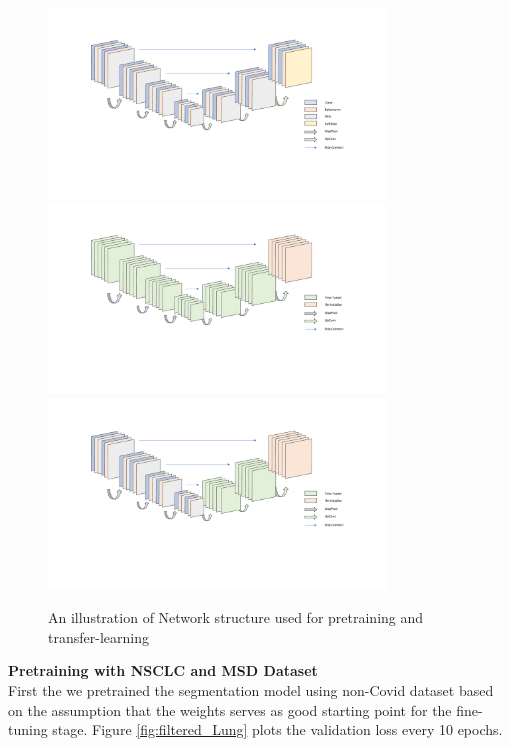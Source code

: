 \begin{figure}
	\centering
	\includegraphics[width=0.8\textwidth]{img/Networks/Unet-train.pdf}
	\includegraphics[width=0.8\textwidth]{img/Networks/Transfer-Finetune-all.pdf}
	\includegraphics[width=0.8\textwidth]{img/Networks/Transfer-freeze-encoder.pdf}
	\caption{An illustration of Network structure used for pretraining and transfer-learning}
	\label{fig:transfer-learning-graph}
\end{figure}

\textbf{Pretraining with NSCLC and MSD Dataset}\\

First the we pretrained the segmentation model using non-Covid dataset based on the assumption that the weights serves as good starting point for the fine-tuning stage. Figure \ref{fig:filtered_Lung} plots the validation loss every 10 epochs.\\

